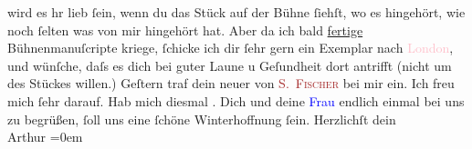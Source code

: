                wird es hr lieb ſein, wenn du das Stück auf der Bühne ſiehſt, wo es hingehört, wie
               noch ſelten was von mir hingehört hat. Aber da {\pb}ich bald \uline{fertige} Bühnenmanuſcripte kriege, ſchicke ich  dir ſehr gern ein Exemplar nach \textcolor{pink}{London}{}\ledrightnote{\textcolor{pink}{London}}, und wünſche, daſs es dich bei guter Laune u Geſundheit dort antrifft (nicht um des Stückes willen.)\pend
           \pstart
           Geſtern traf dein neuer \label{K_L01959_1v}\label{K_L01959_1h} von \textsc{\textcolor{brown}{S. Fischer}{}\ledrightnote{\textcolor{brown}{S. Fischer Verlag}}} bei mir ein. Ich freu
               mich ſehr darauf. Hab mich diesmal \label{K_L01959_2v}\label{K_L01959_2h}.\pend
           \pstart
           {\pb}Dich und deine \textcolor{blue}{Frau}{} endlich einmal bei uns zu
               begrüßen, ſoll uns eine ſchöne Winterhoffnung ſein.\pend
           \pstart
           Herzlichſt dein{\\[\baselineskip]}\spacefill\mbox{Arthur}\pend
           \leftskip=0em{}\endnumbering{}  
      